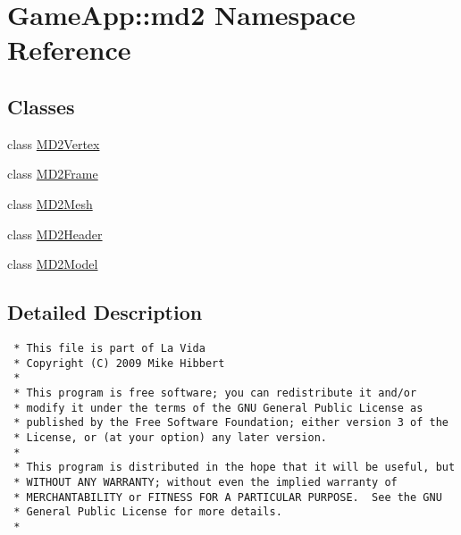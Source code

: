 \hypertarget{namespaceGameApp_1_1md2}{
\section{GameApp::md2 Namespace Reference}
\label{namespaceGameApp_1_1md2}
}


\subsection*{Classes}
\begin{CompactItemize}
\item 
class \hyperlink{classGameApp_1_1md2_1_1MD2Vertex}{MD2Vertex}
\item 
class \hyperlink{classGameApp_1_1md2_1_1MD2Frame}{MD2Frame}
\item 
class \hyperlink{classGameApp_1_1md2_1_1MD2Mesh}{MD2Mesh}
\item 
class \hyperlink{classGameApp_1_1md2_1_1MD2Header}{MD2Header}
\item 
class \hyperlink{classGameApp_1_1md2_1_1MD2Model}{MD2Model}
\end{CompactItemize}


\subsection{Detailed Description}


\footnotesize\begin{verbatim}
 * This file is part of La Vida
 * Copyright (C) 2009 Mike Hibbert
 *
 * This program is free software; you can redistribute it and/or
 * modify it under the terms of the GNU General Public License as
 * published by the Free Software Foundation; either version 3 of the
 * License, or (at your option) any later version.
 *
 * This program is distributed in the hope that it will be useful, but
 * WITHOUT ANY WARRANTY; without even the implied warranty of
 * MERCHANTABILITY or FITNESS FOR A PARTICULAR PURPOSE.  See the GNU
 * General Public License for more details.
 *
\end{verbatim}
\normalsize
 